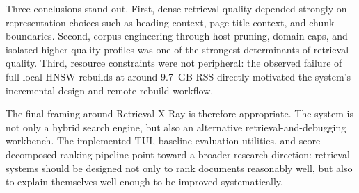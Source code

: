 \documentclass[conference]{IEEEtran}
\newcommand{\system}{Retrieval X-Ray\xspace}
\begin{document}
Three conclusions stand out. First, dense retrieval quality depended strongly on representation choices such as heading context, page-title context, and chunk boundaries. Second, corpus engineering through host pruning, domain caps, and isolated higher-quality profiles was one of the strongest determinants of retrieval quality. Third, resource constraints were not peripheral: the observed failure of full local HNSW rebuilds at around 9.7~GB RSS directly motivated the system's incremental design and remote rebuild workflow.

The final framing around \system is therefore appropriate. The system is not only a hybrid search engine, but also an alternative retrieval-and-debugging workbench. The implemented TUI, baseline evaluation utilities, and score-decomposed ranking pipeline point toward a broader research direction: retrieval systems should be designed not only to rank documents reasonably well, but also to explain themselves well enough to be improved systematically.
\end{document}
